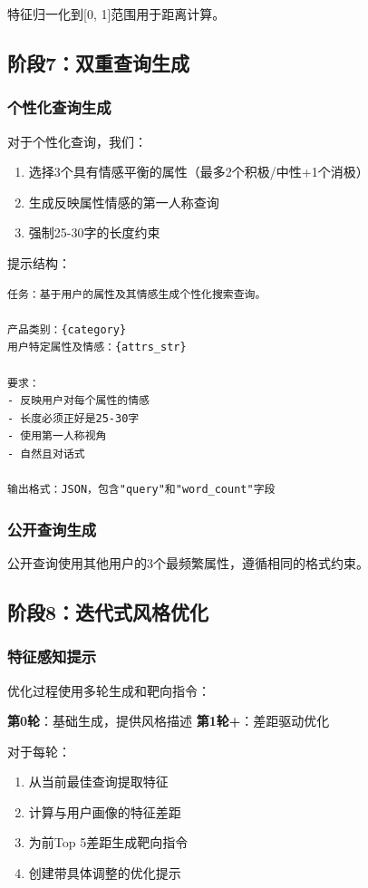 \documentclass[11pt,a4paper]{article}
\begin{document}
特征归一化到[0, 1]范围用于距离计算。

\subsection{阶段7：双重查询生成}

\subsubsection{个性化查询生成}

对于个性化查询，我们：
\begin{enumerate}
    \item 选择3个具有情感平衡的属性（最多2个积极/中性+1个消极）
    \item 生成反映属性情感的第一人称查询
    \item 强制25-30字的长度约束
\end{enumerate}

提示结构：
\begin{verbatim}
任务：基于用户的属性及其情感生成个性化搜索查询。

产品类别：{category}
用户特定属性及情感：{attrs_str}

要求：
- 反映用户对每个属性的情感
- 长度必须正好是25-30字
- 使用第一人称视角
- 自然且对话式

输出格式：JSON，包含"query"和"word_count"字段
\end{verbatim}

\subsubsection{公开查询生成}

公开查询使用其他用户的3个最频繁属性，遵循相同的格式约束。

\subsection{阶段8：迭代式风格优化}

\subsubsection{特征感知提示}

优化过程使用多轮生成和靶向指令：

\textbf{第0轮}：基础生成，提供风格描述
\textbf{第1轮+}：差距驱动优化

对于每轮：
\begin{enumerate}
    \item 从当前最佳查询提取特征
    \item 计算与用户画像的特征差距
    \item 为前Top 5差距生成靶向指令
    \item 创建带具体调整的优化提示
\end{enumerate}
\end{document}
